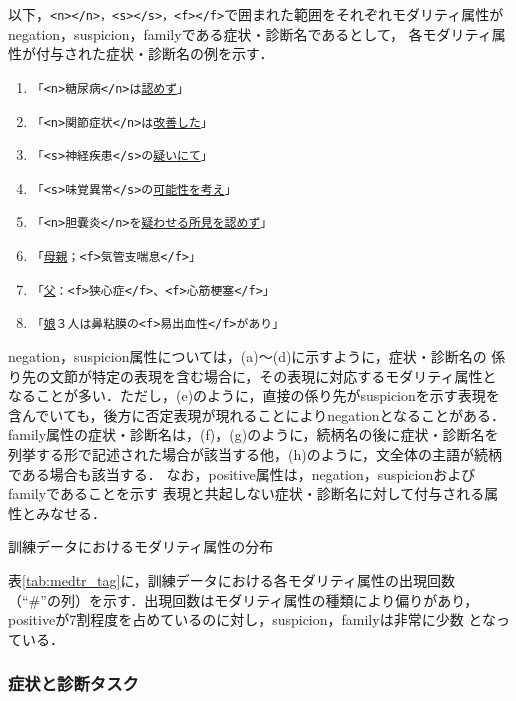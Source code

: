 \documentclass[japanese]{jnlp_1.4}
\begin{document}
以下，{\tt <n></n>，<s></s>，<f></f>}で囲まれた範囲をそれぞれモダリティ属性が
negation，suspicion，familyである症状・診断名であるとして，
各モダリティ属性が付与された症状・診断名の例を示す．
\renewcommand{\labelenumi}{}
\begin{enumerate}
 \item {\tt「<n>糖尿病</n>は\underline{認めず}」}
 \item {\tt「<n>関節症状</n>は\underline{改善した}」}
 \item {\tt「<s>神経疾患</s>の\underline{疑いにて}」}
 \item {\tt「<s>味覚異常</s>の\underline{可能性を考え}」}
 \item {\tt「<n>胆嚢炎</n>を\underline{疑わせる所見を認めず}」}
 \item {\tt「\underline{母親}；<f>気管支喘息</f>」}
 \item {\tt「\underline{父}：<f>狭心症</f>、<f>心筋梗塞</f>」}
 \item {\tt「\underline{娘}３人は鼻粘膜の<f>易出血性</f>があり」}
\end{enumerate}
negation，suspicion属性については，(a)〜(d)に示すように，症状・診断名の
係り先の文節が特定の表現を含む場合に，その表現に対応するモダリティ属性と
なることが多い．ただし，(e)のように，直接の係り先がsuspicionを示す表現を
含んでいても，後方に否定表現が現れることによりnegationとなることがある．
family属性の症状・診断名は，(f)，(g)のように，続柄名の後に症状・診断名を
列挙する形で記述された場合が該当する他，(h)のように，文全体の主語が続柄
である場合も該当する．
なお，positive属性は，negation，suspicionおよびfamilyであることを示す
表現と共起しない症状・診断名に対して付与される属性とみなせる．

\begin{table}[b]
\caption{訓練データにおけるモダリティ属性の分布}
\label{tab:medtr_tag}

\end{table}

表\ref{tab:medtr_tag}に，訓練データにおける各モダリティ属性の出現回数
（``\#''の列）を示す．出現回数はモダリティ属性の種類により偏りがあり，
positiveが7割程度を占めているのに対し，suspicion，familyは非常に少数
となっている．


\subsubsection*{症状と診断タスク}
\end{document}
